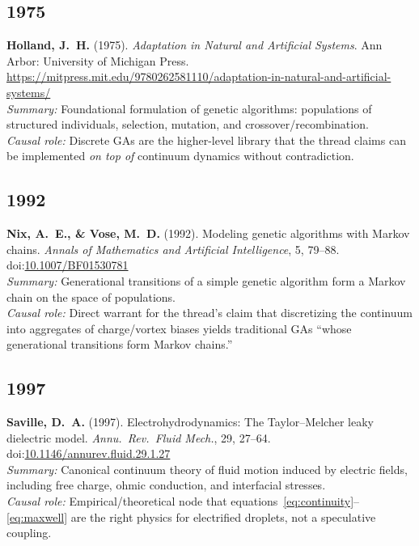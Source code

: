 \documentclass[11pt,a4paper]{article}
\providecommand{\doi}{doi}
\begin{document}
\subsection*{1975}
\textbf{Holland, J.~H.} (1975). \textit{Adaptation in Natural and Artificial Systems}. Ann Arbor: University of Michigan Press.  \\
\url{https://mitpress.mit.edu/9780262581110/adaptation-in-natural-and-artificial-systems/}\\
\textit{Summary:} Foundational formulation of genetic algorithms: populations of structured individuals, selection, mutation, and crossover/recombination.\\
\textit{Causal role:} Discrete GAs are the higher-level library that the thread claims can be implemented \emph{on top of} continuum dynamics without contradiction.

\subsection*{1992}
\textbf{Nix, A.~E., \& Vose, M.~D.} (1992). Modeling genetic algorithms with Markov chains. \textit{Annals of Mathematics and Artificial Intelligence}, 5, 79--88.  \\
\doi:\url{10.1007/BF01530781}\\
\textit{Summary:} Generational transitions of a simple genetic algorithm form a Markov chain on the space of populations.\\
\textit{Causal role:} Direct warrant for the thread's claim that discretizing the continuum into aggregates of charge/vortex biases yields traditional GAs ``whose generational transitions form Markov chains.''

\subsection*{1997}
\textbf{Saville, D.~A.} (1997). Electrohydrodynamics: The Taylor--Melcher leaky dielectric model. \textit{Annu.\ Rev.\ Fluid Mech.}, 29, 27--64.  \\
\doi:\url{10.1146/annurev.fluid.29.1.27}\\
\textit{Summary:} Canonical continuum theory of fluid motion induced by electric fields, including free charge, ohmic conduction, and interfacial stresses.\\
\textit{Causal role:} Empirical/theoretical node that equations~\eqref{eq:continuity}--\eqref{eq:maxwell} are the right physics for electrified droplets, not a speculative coupling.
\end{document}
